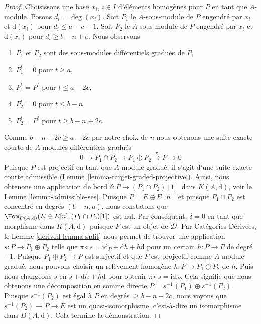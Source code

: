 \begin{proof}
\medskip\noindent
Choisissons une base $x_i$, $i \in I$ d'éléments homogènes pour $P$ en tant que
$A$-module. Posons $d_i = \deg(x_i)$. Soit $P_1$ le $A$-sous-module de $P$
engendré par $x_i$ et $\text{d}(x_i)$ pour $d_i \leq a - c - 1$. Soit $P_2$ le
$A$-sous-module de $P$ engendré par $x_i$ et $\text{d}(x_i)$ pour $d_i \geq b - n
+ c$. Nous observons
\begin{enumerate}
\item $P_1$ et $P_2$ sont des sous-modules différentiels gradués de $P$,
\item $P_1^t = 0$ pour $t \geq a$,
\item $P_1^t = P^t$ pour $t \leq a - 2c$,
\item $P_2^t = 0$ pour $t \leq b - n$,
\item $P_2^t = P^t$ pour $t \geq b - n + 2c$.
\end{enumerate}
Comme $b - n + 2c \geq a - 2c$ par notre choix de $n$ nous obtenons une suite
exacte courte de $A$-modules différentiels gradués
$$
0 \to P_1 \cap P_2 \to P_1 \oplus P_2 \xrightarrow{\pi} P \to 0
$$
Puisque $P$ est projectif en tant que $A$-module gradué, il s'agit d'une suite
exacte courte admissible (Lemme \ref{lemma-target-graded-projective}). Ainsi, nous
obtenons une application de bord $\delta : P \to (P_1 \cap P_2)[1]$ dans
$K(A, \text{d})$, voir le Lemme \ref{lemma-admissible-ses}. Puisque $P = E \oplus
E[n]$ et puisque $P_1 \cap P_2$ est concentré en degrés $(b - n, a)$, nous constatons
que $\Hom_{D(A, \text{d})}(E \oplus E[n], (P_1 \cap P_2)[1])$ est nul. Par
conséquent, $\delta = 0$ en tant que morphisme dans $K(A, \text{d})$ puisque
$P$ est un objet de $\mathcal{D}$. Par Catégories Dérivées, le Lemme
\ref{derived-lemma-split} nous permet de trouver une application $s : P \to P_1
\oplus P_2$ telle que $\pi \circ s = \text{id}_P + \text{d}h + h\text{d}$ pour un
certain $h : P \to P$
de degré $-1$. Puisque $P_1 \oplus P_2 \to P$ est surjectif et que $P$ est
projectif comme $A$-module gradué, nous pouvons choisir un relèvement
homogène $\tilde h : P \to P_1 \oplus P_2$ de $h$. Puis nous changeons $s$ en $s +
\text{d} \tilde h + \tilde h \text{d}$ pour obtenir $\pi \circ s = \text{id}_P$.
Cela signifie que nous obtenons une décomposition en somme directe $P =
s^{-1}(P_1) \oplus s^{-1}(P_2)$. Puisque $s^{-1}(P_2)$ est égal à $P$ en degrés
$\geq b - n + 2c$, nous voyons que $s^{-1}(P_2) \to P \to E$ est un
quasi-isomorphisme, c'est-à-dire un isomorphisme dans $D(A, \text{d})$. Cela termine
la démonstration.
\end{proof}









